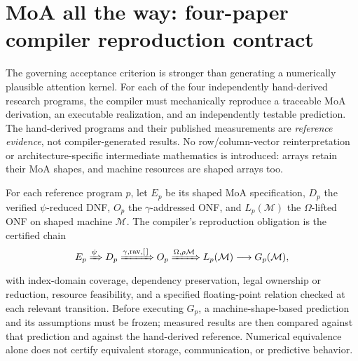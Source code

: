 \documentclass[11pt]{article}
\begin{document}
\section{MoA all the way: four-paper compiler reproduction contract}
\label{sec:fourpapercontract}
The governing acceptance criterion is stronger than generating a numerically plausible attention kernel. For each of the four independently hand-derived research programs, the compiler must mechanically reproduce a traceable MoA derivation, an executable realization, and an independently testable prediction. The hand-derived programs and their published measurements are \emph{reference evidence}, not compiler-generated results. No row/column-vector reinterpretation or architecture-specific intermediate mathematics is introduced: arrays retain their MoA shapes, and machine resources are shaped arrays too.

For each reference program $p$, let $E_p$ be its shaped MoA specification, $D_p$ the verified $\psi$-reduced DNF, $O_p$ the $\gamma$-addressed ONF, and $L_p(\mathcal M)$ the $\Omega$-lifted ONF on shaped machine $\mathcal M$. The compiler's reproduction obligation is the certified chain
\[
E_p \xRightarrow{\psi} D_p
\xRightarrow{\gamma,\operatorname{rav},[\,]} O_p
\xRightarrow{\Omega,\rho\mathcal M} L_p(\mathcal M)
\longrightarrow G_p(\mathcal M),
\]
with index-domain coverage, dependency preservation, legal ownership or reduction, resource feasibility, and a specified floating-point relation checked at each relevant transition. Before executing $G_p$, a machine-shape-based prediction and its assumptions must be frozen; measured results are then compared against that prediction and against the hand-derived reference. Numerical equivalence alone does not certify equivalent storage, communication, or predictive behavior.
\end{document}
